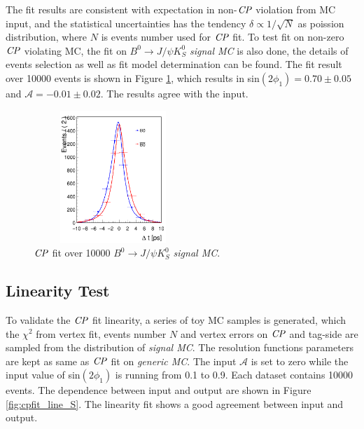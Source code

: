 The fit results are consistent with expectation in non-$\it{CP}$ violation from MC input, and the statistical uncertainties has the tendency $\delta \propto 1/\sqrt{N}$ as poission distribution, where $N$ is events number used for $\it{CP}$ fit. To test fit on non-zero $\it{CP}$ violating MC, the fit on $B^0\to J/\psi K_S^0$ \textit{signal MC} is also done, the details of events selection as well as fit model determination can be found\cite{jpsiks_ichep}. The fit result over 10000 events is shown in Figure \ref{fig:cpfit_jpsiks}, which results in sin$(2\phi_1) = 0.70 \pm 0.05 $ and $\mathcal{A} = -0.01\pm 0.02$. The results agree with the input.
\begin{figure}[H]
	\centering
	\includegraphics[height=5cm,width=6cm]{figures/jpsiks_cpfit10000}
	\caption{$\it{CP}$ fit over 10000 $B^0\to J/\psi K_S^0$ \textit{signal MC}. }
	\label{fig:cpfit_jpsiks}
\end{figure}

\subsection{Linearity Test}
To validate the $\it{CP}$ fit linearity, a series of toy MC samples is generated, which the $\chi^2$ from vertex fit, events number $N$ and vertex errors on $\it{CP}$ and tag-side are sampled from the distribution of \textit{signal MC}. The resolution functions parameters are kept as same as $\it{CP}$ fit on \textit{generic MC}. The input $\mathcal{A}$ is set to zero while the input value of sin$(2\phi_1)$ is running from 0.1 to 0.9. Each dataset contains 10000 events. The dependence between input and output are shown in Figure \ref{fig:cpfit_line_S}. The linearity fit shows a good agreement between input and output.

